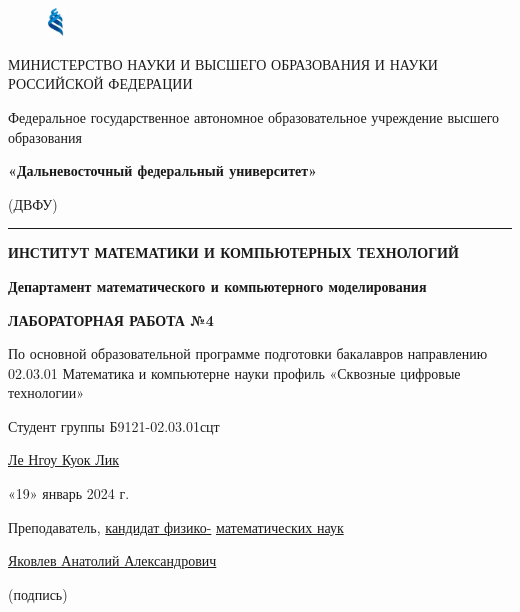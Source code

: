 \documentclass[a4paper, 12pt, fleqn]{article}
\begin{document}
\begin{titlepage}
\begin{figure}[!htb]
\centering
\includegraphics[width=0.04\textwidth]{fefu_logo.jpg}
\end{figure}
\begin{center}
\fontsize{10pt}{18pt}\selectfont
МИНИСТЕРСТВО НАУКИ И ВЫСШЕГО ОБРАЗОВАНИЯ И НАУКИ РОССИЙСКОЙ ФЕДЕРАЦИИ

Федеральное государственное автономное образовательное учреждение высшего образования

\textbf{«Дальневосточный федеральный университет»}

(ДВФУ)

\end{center}
\vspace{2mm}
\noindent\rule{\textwidth}{2pt}
\vspace{2mm}
\begin{center}
\textbf{ИНСТИТУТ МАТЕМАТИКИ И КОМПЬЮТЕРНЫХ ТЕХНОЛОГИЙ}

\vspace{12mm}
\textbf{Департамент математического и компьютерного моделирования}

\vspace{12mm}
\textbf{ЛАБОРАТОРНАЯ РАБОТА №4}

\vspace{3mm}
По основной образовательной программе подготовки бакалавров направлению 02.03.01 Математика и компьютерне науки профиль «Сквозные цифровые технологии»
\vspace{9mm}
\end{center}
\hfill
\begin{minipage}[t]{0.5\textwidth}
\raggedright
Студент группы Б9121-02.03.01сцт

\vspace{2mm}
\underline{Ле Нгоу Куок Лик}

\vspace{2mm}
«19» январь 2024 г.

\vspace{24pt}
Преподаватель, \underline{кандидат физико-} \underline{математических наук\phantom{qqqqqqqqqqq}}

\vspace{2mm}
\underline{Яковлев Анатолий Александрович}

\vspace{2mm}
\underline{\phantom{s}\hspace{5cm}} (подпись)


\end{minipage}
\end{titlepage}
\end{document}

